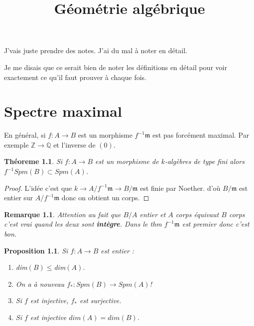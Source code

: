 \documentclass[a4paper,12pt]{book}
\title{Géométrie algébrique}
\date{}
\newcommand{\Z}{\mathbb{Z}}
\newcommand{\Q}{\mathbb{Q}}
\newcommand{\m}{\mathfrak{m}}
\theoremstyle{plain}
\newtheorem{thm}[subsection]{Théoreme}
\newtheorem{prop}[subsection]{Proposition}
\newtheorem{rem}{Remarque}
\theoremstyle{definition}
\theoremstyle{remark}
\begin{document}
\maketitle
\tableofcontents

J'vais juste prendre des notes. J'ai du mal à
noter en détail.

Je me disais que ce serait bien de noter les définitions
en détail pour voir exactement ce qu'il faut prouver à 
chaque fois.
\chapter{Spectre maximal}
En général, si $f\colon A \to B$ est un morphisme
$f^{-1}\m$ est pas forcément maximal. Par exemple
$\Z\to \Q$ et l'inverse de $(0)$. 
\begin{thm}
    Si $f\colon A\to B$ est un morphisme de $k$-algèbres
    de type fini alors $f^{-1}Spm(B)\subset Spm(A)$.
\end{thm}
\begin{proof}
    L'idée c'est que $k\to A/f^{-1}\m\to B/\m$ est finie
    par Noether. d'où $B/\m$ est entier sur $A/f^{-1}\m$
    donc on obtient un corps.
\end{proof}
\begin{rem}
    Attention au fait que $B/A$ entier et $A$ corps équivaut $B$ corps
    c'est vrai quand les deux sont \textbf{intègre}. Dans le thm
    $f^{-1}\m$ est premier donc c'est bon.
\end{rem}
\begin{prop}
    Si $f\colon A\to B$ est entier :
    \begin{enumerate}
	\item dim$(B)\leq$dim$(A)$.
	\item On a à nouveau $f_*\colon Spm(B)\to Spm(A)$!
	\item Si $f$ est injective, $f_*$ est surjective.
	\item Si $f$ est injective $dim(A)=dim(B)$.
    \end{enumerate}
\end{prop}
\end{document}
